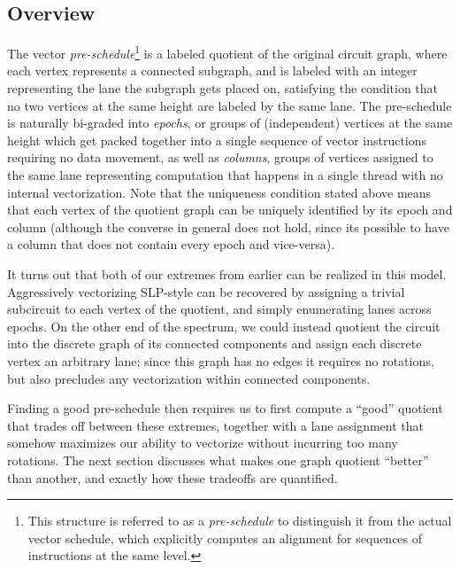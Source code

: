 \subsection{Overview}
The vector {\em pre-schedule}\footnote{This structure is referred to as a {\em pre-schedule} to distinguish it from the actual vector schedule, which explicitly computes an alignment for sequences of instructions at the same level. } is a labeled quotient of the original circuit graph, where each vertex represents a connected subgraph, and is labeled with an integer representing the lane the subgraph gets placed on, satisfying the condition that no two vertices at the same height are labeled by the same lane.
The pre-schedule is naturally bi-graded into {\em epochs}, or groups of (independent) vertices at the same height which get packed together into a single sequence of vector instructions requiring no data movement, as well as {\em columns}, groups of vertices assigned to the same lane representing computation that happens in a single thread with no internal vectorization.
Note that the uniqueness condition stated above means that each vertex of the quotient graph can be uniquely identified by its epoch and column (although the converse in general does not hold, since its possible to have a column that does not contain every epoch and vice-versa).

It turns out that both of our extremes from earlier can be realized in this model.
Aggressively vectorizing SLP-style can be recovered by assigning a trivial subcircuit to each vertex of the quotient, and simply enumerating lanes across epochs.
On the other end of the spectrum, we could instead quotient the circuit into the discrete graph of its connected components and assign each discrete vertex an arbitrary lane; since this graph has no edges it requires no rotations, but also precludes any vectorization within connected components.

Finding a good pre-schedule then requires us to first compute a ``good'' quotient that trades off between these extremes, together with a lane assignment that somehow maximizes our ability to vectorize without incurring too many rotations.
The next section discusses what makes one graph quotient ``better'' than another, and exactly how these tradeoffs are quantified.

